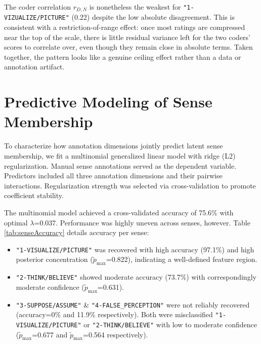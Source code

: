 \documentclass[
]{article}
\providecommand{\tightlist}{%
  \setlength{\itemsep}{0pt}\setlength{\parskip}{0pt}}
\begin{document}
The coder correlation \(r_{D,N}\) is nonetheless the weakest for
\texttt{"1-VIZUALIZE/PICTURE"} (0.22) despite the low absolute
disagreement. This is consistent with a restriction-of-range effect:
once most ratings are compressed near the top of the scale, there is
little residual variance left for the two coders' scores to correlate
over, even though they remain close in absolute terms. Taken together,
the pattern looks like a genuine ceiling effect rather than a data or
annotation artifact.

\pagebreak

\section{Predictive Modeling of Sense
Membership}\label{predictive-modeling-of-sense-membership}

To characterize how annotation dimensions jointly predict latent sense
membership, we fit a multinomial generalized linear model with ridge
(L2) regularization. Manual sense annotations served as the dependent
variable. Predictors included all three annotation dimensions and their
pairwise interactions. Regularization strength was selected via
cross-validation to promote coefficient stability.

The multinomial model achieved a cross-validated accuracy of 75.6\% with
optimal \(\lambda\)=0.037. Performance was highly uneven across senses,
however. Table \ref{tab:senseAccuracy} details accuracy per sense:

\begin{itemize}
\tightlist
\item
  \texttt{"1-VISUALIZE/PICTURE"} was recovered with high accuracy
  (97.1\%) and high posterior concentration
  (\(\tilde{p}_{\max}\)=0.822), indicating a well-defined feature
  region.
\item
  \texttt{"2-THINK/BELIEVE"} showed moderate accuracy (73.7\%) with
  correspondingly moderate confidence (\(\tilde{p}_{\max}\)=0.631).
\item
  \texttt{"3-SUPPOSE/ASSUME"} \& \texttt{"4-FALSE\_PERCEPTION"} were not
  reliably recovered (accuracy=0\% and 11.9\% respectively). Both were
  misclassified \texttt{"1-VISUALIZE/PICTURE"} or
  \texttt{"2-THINK/BELIEVE"} with low to moderate confidence
  (\(\tilde{p}_{\max}\)=0.677 and \(\tilde{p}_{\max}\)=0.564
  respectively).
\end{itemize}
\end{document}
